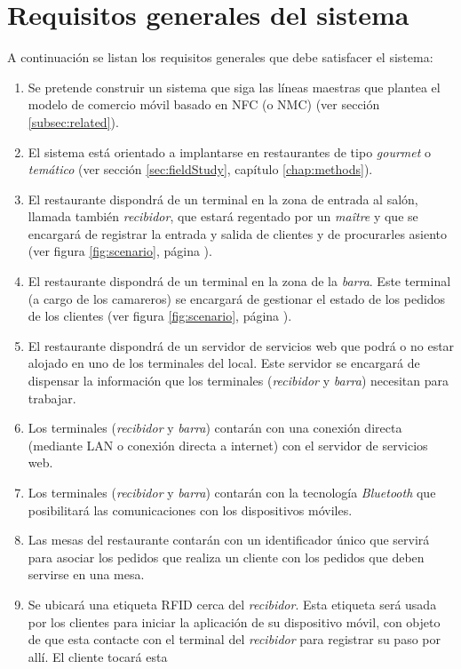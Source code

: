 \section{Requisitos generales del sistema}
A continuación se listan los requisitos generales que debe satisfacer el
sistema:
\begin{enumerate}
\item Se pretende construir un sistema que siga las líneas maestras que
plantea el modelo de comercio móvil basado en \acs{NFC} (o \acs{NMC}) (ver
sección \ref{subsec:related}).
\item El sistema está orientado a implantarse en restaurantes de tipo
\emph{gourmet} o \emph{temático} (ver sección \ref{sec:fieldStudy}, capítulo
 \ref{chap:methods}).
\item El restaurante dispondrá de un terminal en la zona de entrada al salón,
llamada también \emph{recibidor}, que estará regentado por un \emph{maître} y
que se encargará de registrar la entrada y salida de clientes y de procurarles
asiento (ver figura \ref{fig:scenario}, página \pageref{fig:scenario}).
\item El restaurante dispondrá de un terminal en la zona de la \emph{barra}.
Este terminal (a cargo de los camareros) se encargará de gestionar el estado de
los pedidos de los clientes (ver figura \ref{fig:scenario}, página
\pageref{fig:scenario}).
\item El restaurante dispondrá de un servidor de servicios web que podrá o no
estar alojado en uno de los terminales del local. Este servidor se encargará
de dispensar la información que los terminales (\emph{recibidor} y
\emph{barra}) necesitan para trabajar.
\item Los terminales (\emph{recibidor} y \emph{barra}) contarán con una 
conexión directa (mediante \acs{LAN} o conexión directa a internet) con el
servidor de servicios web.
\item Los terminales (\emph{recibidor} y \emph{barra}) contarán con la
tecnología \emph{Bluetooth} que posibilitará las comunicaciones con los
dispositivos móviles.
\item Las mesas del restaurante contarán con un identificador único que
servirá para asociar los pedidos que realiza un cliente con los pedidos que
deben servirse en una mesa.
\item Se ubicará una etiqueta \acs{RFID} cerca del \emph{recibidor}. Esta
etiqueta será usada por los clientes para iniciar la aplicación de su
dispositivo móvil, con objeto de que esta contacte con el terminal del
\emph{recibidor} para registrar su paso por allí. El cliente tocará esta

\end{enumerate}
